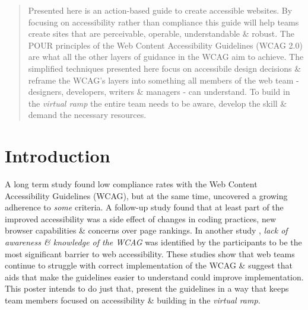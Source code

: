 \documentclass{acm_proc_article-sp}
\begin{document}
\maketitle
\begin{abstract}
Presented here is an action-based guide to create accessible websites. By focusing on accessibility rather than compliance this guide will help teams create sites that are perceivable, operable, understandable \& robust. The POUR principles of the Web Content Accessibility Guidelines (WCAG 2.0) \cite{wcag2} are what all the other layers of guidance in the WCAG aim to achieve. The simplified techniques presented here focus on accessibile design decisions \& reframe the WCAG's layers into something all members of the web team - designers, developers, writers \& managers - can understand. To build in the \textit{virtual ramp} the entire team needs to be aware, develop the skill \& demand the necessary resources.

\end{abstract}



\section{Introduction}
A long term study \cite{hanson:progress} found low compliance rates with the Web Content Accessibility Guidelines (WCAG), but at the same time, uncovered a growing adherence to \textit{some} criteria. A follow-up study \cite{richards:side} found that at least part of the improved accessibility was a side effect of changes in coding practices, new browser capabilities \& concerns over page rankings. In another study \cite{lazar:perceptions}, \textit{lack of awareness \& knowledge of the WCAG} was identified by the participants to be the most significant barrier to web accessibility. These studies show that web teams continue to struggle with correct implementation of the WCAG \& suggest that aids that make the guidelines easier to understand could improve implementation. This poster intends to do just that, present the guidelines in a way that keeps team members focused on accessibility \& building in the \textit{virtual ramp}. 
\end{document}
